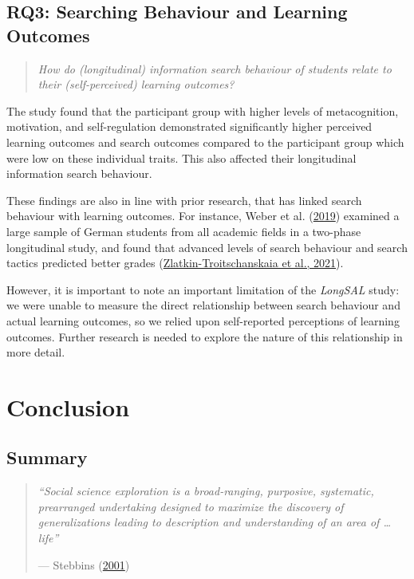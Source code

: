 \documentclass[letterpaper, nobind]{templates/ociamthesis}
\begin{document}
\hypertarget{rq3-searching-behaviour-and-learning-outcomes}{%
\section{RQ3: Searching Behaviour and Learning Outcomes}\label{rq3-searching-behaviour-and-learning-outcomes}}

\begin{quote}
\emph{How do (longitudinal) information search behaviour of students relate to their (self-perceived) learning outcomes?}
\end{quote}

The study found that the participant group with higher levels of metacognition, motivation, and self-regulation demonstrated significantly higher perceived learning outcomes and search outcomes compared to the participant group which were low on these individual traits.
This also affected their longitudinal information search behaviour.

These findings are also in line with prior research, that has linked search behaviour with learning outcomes.
For instance, Weber et al. (\protect\hyperlink{ref-weber2019informationseeking}{2019}) examined a large sample of German students from all academic fields in a two-phase longitudinal study, and found that advanced levels of search behaviour and search tactics predicted better grades (\protect\hyperlink{ref-zlatkin2021students}{Zlatkin-Troitschanskaia et al., 2021}).

However, it is important to note an important limitation of the \emph{LongSAL} study: we were unable to measure the direct relationship between search behaviour and actual learning outcomes, so we relied upon self-reported perceptions of learning outcomes.
Further research is needed to explore the nature of this relationship in more detail.

\hypertarget{conclusion}{%
\chapter{Conclusion}\label{conclusion}}

\hypertarget{summary-1}{%
\section{Summary}\label{summary-1}}

\begin{quote}
\emph{``Social science exploration is a broad-ranging, purposive, systematic, prearranged undertaking designed to maximize the discovery of generalizations leading to description and understanding of an area of \ldots{} life''}

\hfill --- Stebbins (\protect\hyperlink{ref-stebbins2001exploratory}{2001})
\end{quote}
\end{document}
